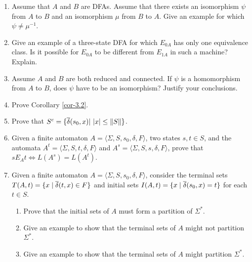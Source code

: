 \begin{enumerate}[{3.}1. ]
\item Assume that $A$ and $B$ are DFAs. Assume that there exists an isomorphism
$\psi$ from $A$ to $B$ and an isomorphism $\mu$ from $B$ to $A$. Give an example
for which $\psi \not= \mu^{-1}$.

\item Give an example of a three-state DFA for which $E_{0A}$ has only one
equivalence class. Is it possible for $E_{0A}$ to be different from $E_{1A}$ in
such a machine? Explain.

\item Assume $A$ and $B$ are both reduced and connected. If $\psi$ is a homomorphism
from $A$ to $B$, does $\psi$ have to be an isomorphism? Justify your
conclusions.

\item Prove Corollary \ref{cor-3.2}.

\item Prove that $S^c =\{\overline{\delta}(s_0,x)|\ |x| \leq \|S\|\}$.

\item Given a finite automaton $A=\langle\Sigma,S,s_0,\delta,F\rangle$, two
states $s,t \in S$, and the automata $A^t=\langle\Sigma,S,t,\delta,F\rangle$ and
$A^s=\langle\Sigma,S,s,\delta,F\rangle$, prove that $s E_A t \Leftrightarrow
L(A^s) = L(A^t)$.

\item Given a finite automaton $A=\langle\Sigma,S,s_0,\delta,F\rangle$, consider
the terminal sets $T(A,t)=\{x \mid \overline{\delta}(t,x) \in F\}$ and initial sets
$I(A,t)=\{x \mid \overline{\delta}(s_0,x) = t\}$ for each $t \in S$.
\begin{enumerate}
\item Prove that the initial sets of $A$ must form a partition of $\Sigma^*$.
\item Give an example to show that the terminal sets of $A$ might not partition
$\Sigma^*$.
\item Give an example to show that the terminal sets of $A$ might partition
$\Sigma^*$.
\end{enumerate}
\end{enumerate}

